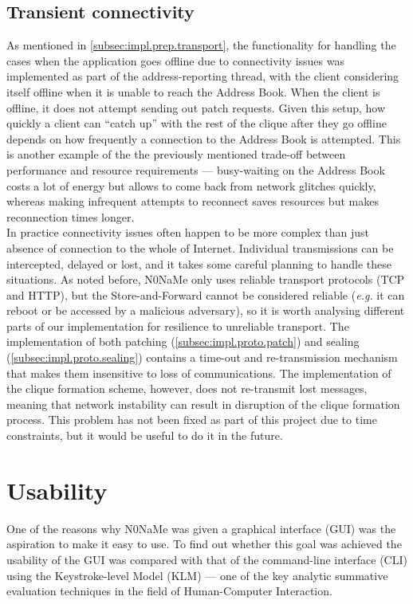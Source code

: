 \documentclass[a4paper, 12pt]{report}
\newcommand{\funkytt}{\fontfamily{AnonymousPro}\selectfont}
\begin{document}
\subsection{Transient connectivity}
As mentioned in \cref{subsec:impl.prep.transport}, the functionality for handling the cases when the application goes offline due to connectivity issues was implemented as part of the address-reporting thread, with the client considering itself offline when it is unable to reach the Address Book. When the client is offline, it does not attempt sending out patch requests. Given this setup, how quickly a client can ``catch up'' with the rest of the clique after they go offline depends on how frequently a connection to the Address Book is attempted. This is another example of the the previously mentioned trade-off between performance and resource requirements --- busy-waiting on the Address Book costs a lot of energy but allows to come back from network glitches quickly, whereas making infrequent attempts to reconnect saves resources but makes reconnection times longer. \\


In practice connectivity issues often happen to be more complex than just absence of connection to the whole of Internet. Individual transmissions can be intercepted, delayed or lost, and it takes some careful planning to handle these situations. As noted before, {\funkytt N0NaMe} only uses reliable transport protocols (TCP and HTTP), but the Store-and-Forward cannot be considered reliable (\textit{e.g.} it can reboot or be accessed by a malicious adversary), so it is worth analysing different parts of our implementation for resilience to unreliable transport. The implementation of both patching (\cref{subsec:impl.proto.patch}) and sealing (\cref{subsec:impl.proto.sealing}) contains a time-out and re-transmission mechanism that makes them insensitive to loss of communications. The implementation of the clique formation scheme, however, does not re-transmit lost messages, meaning that network instability can result in disruption of the clique formation process. This problem has not been fixed as part of this project due to time constraints, but it would be useful to do it in the future.

\section{Usability}
\label{sec:eval.usability}
One of the reasons why {\funkytt N0NaMe} was given a graphical interface (GUI) was the aspiration to make it easy to use. To find out whether this goal was achieved the usability of the GUI was compared with that of the command-line interface (CLI) using the Keystroke-level Model (KLM) --- one of the key analytic summative evaluation techniques in the field of Human-Computer Interaction. \\
\end{document}

